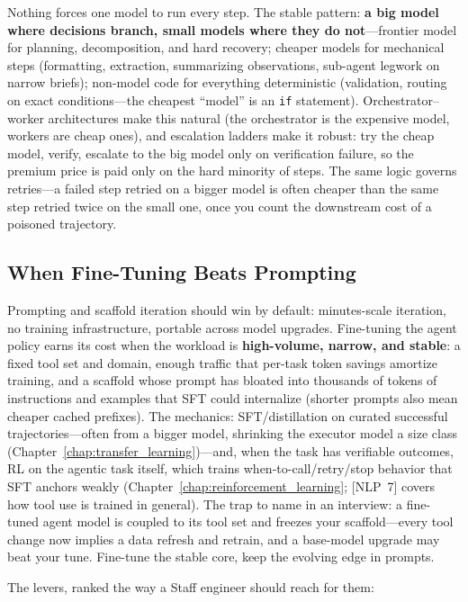 Nothing forces one model to run every step. The stable pattern: \textbf{a big model where decisions branch, small models where they do not}---frontier model for planning, decomposition, and hard recovery; cheaper models for mechanical steps (formatting, extraction, summarizing observations, sub-agent legwork on narrow briefs); non-model code for everything deterministic (validation, routing on exact conditions---the cheapest ``model'' is an \texttt{if} statement). Orchestrator--worker architectures make this natural (the orchestrator is the expensive model, workers are cheap ones), and escalation ladders make it robust: try the cheap model, verify, escalate to the big model only on verification failure, so the premium price is paid only on the hard minority of steps. The same logic governs retries---a failed step retried on a bigger model is often cheaper than the same step retried twice on the small one, once you count the downstream cost of a poisoned trajectory.

\subsection{When Fine-Tuning Beats Prompting}

Prompting and scaffold iteration should win by default: minutes-scale iteration, no training infrastructure, portable across model upgrades. Fine-tuning the agent policy earns its cost when the workload is \textbf{high-volume, narrow, and stable}: a fixed tool set and domain, enough traffic that per-task token savings amortize training, and a scaffold whose prompt has bloated into thousands of tokens of instructions and examples that SFT could internalize (shorter prompts also mean cheaper cached prefixes). The mechanics: SFT/distillation on curated successful trajectories---often from a bigger model, shrinking the executor model a size class (Chapter~\ref{chap:transfer_learning})---and, when the task has verifiable outcomes, RL on the agentic task itself, which trains when-to-call/retry/stop behavior that SFT anchors weakly (Chapter~\ref{chap:reinforcement_learning}; [NLP~7] covers how tool use is trained in general). The trap to name in an interview: a fine-tuned agent model is coupled to its tool set and freezes your scaffold---every tool change now implies a data refresh and retrain, and a base-model upgrade may beat your tune. Fine-tune the stable core, keep the evolving edge in prompts.

The levers, ranked the way a Staff engineer should reach for them:

